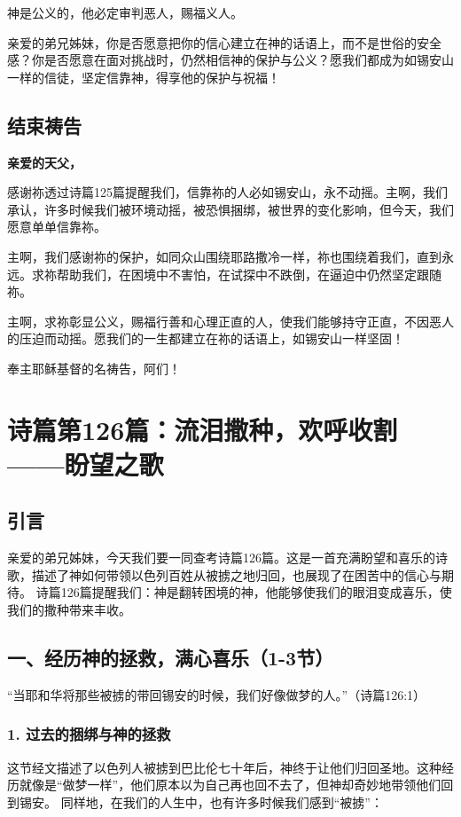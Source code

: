 \documentclass[a4paper, 12pt]{article}
\begin{document}
神是公义的，他必定审判恶人，赐福义人。

亲爱的弟兄姊妹，你是否愿意把你的信心建立在神的话语上，而不是世俗的安全感？你是否愿意在面对挑战时，仍然相信神的保护与公义？愿我们都成为如锡安山一样的信徒，坚定信靠神，得享他的保护与祝福！

\subsection*{结束祷告}

\textbf{亲爱的天父，}

感谢祢透过诗篇125篇提醒我们，信靠祢的人必如锡安山，永不动摇。主啊，我们承认，许多时候我们被环境动摇，被恐惧捆绑，被世界的变化影响，但今天，我们愿意单单信靠祢。

主啊，我们感谢祢的保护，如同众山围绕耶路撒冷一样，祢也围绕着我们，直到永远。求祢帮助我们，在困境中不害怕，在试探中不跌倒，在逼迫中仍然坚定跟随祢。

主啊，求祢彰显公义，赐福行善和心理正直的人，使我们能够持守正直，不因恶人的压迫而动摇。愿我们的一生都建立在祢的话语上，如锡安山一样坚固！

奉主耶稣基督的名祷告，阿们！
\newpage
\section{诗篇第126篇：流泪撒种，欢呼收割——盼望之歌}
\subsection*{引言}
亲爱的弟兄姊妹，今天我们要一同查考诗篇126篇。这是一首充满盼望和喜乐的诗歌，描述了神如何带领以色列百姓从被掳之地归回，也展现了在困苦中的信心与期待。
诗篇126篇提醒我们：神是翻转困境的神，他能够使我们的眼泪变成喜乐，使我们的撒种带来丰收。 
\subsection*{一、经历神的拯救，满心喜乐（1-3节）}
“当耶和华将那些被掳的带回锡安的时候，我们好像做梦的人。”（诗篇126:1）

\subsubsection*{1. 过去的捆绑与神的拯救}
这节经文描述了以色列人被掳到巴比伦七十年后，神终于让他们归回圣地。这种经历就像是“做梦一样”，他们原本以为自己再也回不去了，但神却奇妙地带领他们回到锡安。
同样地，在我们的人生中，也有许多时候我们感到“被掳”：
\end{document}
